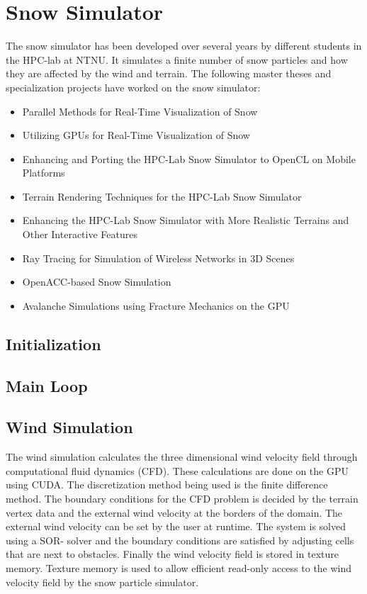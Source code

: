 \section{Snow Simulator}

The snow simulator has been developed over several years by different students in 
the HPC-lab at NTNU. It simulates a finite number of snow particles and how they 
are affected by the wind and terrain. The following master theses and specialization 
projects have worked on the snow simulator:

\begin{itemize}
	\item Parallel Methods for Real-Time Visualization of Snow\cite{originalSnowThesis}
	\item Utilizing GPUs for Real-Time Visualization of Snow\cite{gpuSnowThesis}
	\item Enhancing and Porting the HPC-Lab Snow Simulator to OpenCL on Mobile Platforms
	\cite{openclSnowThesis}
	\item Terrain Rendering Techniques for the HPC-Lab Snow Simulator\cite{snowTerrainThesis}
	\item Enhancing the HPC-Lab Snow Simulator with More Realistic Terrains and Other Interactive Features
	\cite{realisticSnowTerrainThesis}
	\item Ray Tracing for Simulation of Wireless Networks in 3D Scenes\cite{rayTracingThesis}
	\item OpenACC-based Snow Simulation\cite{openAccThesis}
	\item Avalanche Simulations using Fracture Mechanics on the GPU\cite{avalancheThesis}
\end{itemize}

\subsection{Initialization}

\subsection{Main Loop}

\subsection{Wind Simulation}

The wind simulation calculates the three dimensional wind velocity field through
computational fluid dynamics (CFD). These calculations are done on the GPU using
CUDA. The discretization method being used is the finite difference method. The
boundary conditions for the CFD problem is decided by the terrain vertex data
and the external wind velocity at the borders of the domain. The external wind
velocity can be set by the user at runtime. The system is solved using a SOR-
solver and the boundary conditions are satisfied by adjusting cells that are
next to obstacles. Finally the wind velocity field is stored in texture memory.
Texture memory is used to allow efficient read-only access to the wind velocity
field by the snow particle simulator.
